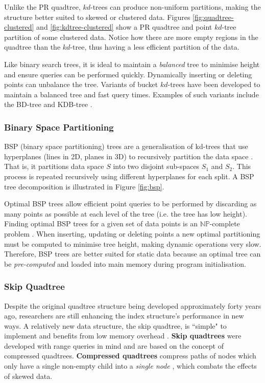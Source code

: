 Unlike the PR quadtree, $kd$-trees can produce non-uniform partitions, making the structure better suited to skewed or clustered data. Figures \ref{fig:quadtree-clustered} and \ref{fig:kdtree-clustered} show a PR quadtree and point $kd$-tree partition of some clustered data. Notice how there are more empty regions in the quadtree than the $kd$-tree, thus having a less efficient partition of the data.

Like binary search trees, it is ideal to maintain a \textit{balanced} tree to minimise height and ensure queries can be performed quickly. Dynamically inserting or deleting points can unbalance the tree. Variants of bucket $kd$-trees have been developed to maintain a balanced tree and fast query times. Examples of such variants include the BD-tree \cite{kdtree-v-bdtree} and KDB-tree \cite{kdb-tree}.

\subsubsection{Binary Space Partitioning}

BSP (binary space partitioning) trees are a generalisation of kd-trees that use hyperplanes (lines in 2D, planes in 3D) to recursively partition the data space \cite{bsp-tree}. That is, it partitions data space $S$ into two disjoint sub-spaces $S_1$ and $S_2$. This process is repeated recursively using different hyperplanes for each split. A BSP tree decomposition is illustrated in Figure \ref{fig:bsp}.

Optimal BSP trees allow efficient point queries to be performed by discarding as many points as possible at each level of the tree (i.e. the tree has low height). Finding optimal BSP trees for a given set of data points is an $\mathbb{NP}$-complete problem \cite{bsp-np-hard}. When inserting, updating or deleting points a new optimal partitioning must be computed to minimise tree height, making dynamic operations very slow. Therefore, BSP trees are better suited for static data because an optimal tree can be \textit{pre-computed} and loaded into main memory during program initialisation.

\subsubsection{Skip Quadtree}

Despite the original quadtree structure being developed approximately forty years ago, researchers are still enhancing the index structure's performance in new ways. A relatively new data structure, the skip quadtree, is ``simple" to implement and benefits from low memory overhead \cite{skip-quadtree}. \textbf{Skip quadtrees} were developed with range queries in mind and are based on the concept of compressed quadtrees. \textbf{Compressed quadtrees} compress paths of nodes which only have a single non-empty child into a \textit{single node} \cite{compressed-quadtree}, which combats the effects of skewed data.

